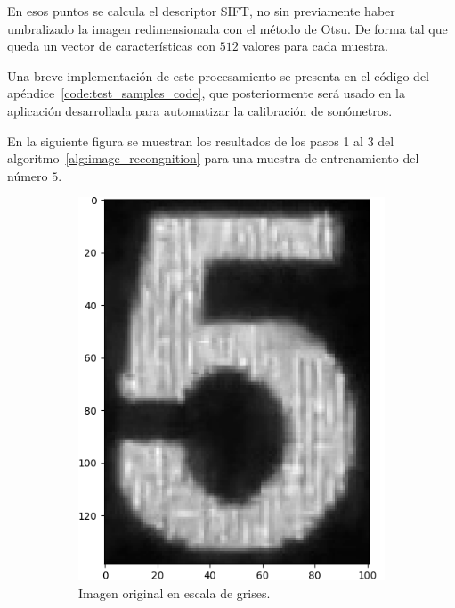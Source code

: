 En esos puntos se calcula el descriptor SIFT, no sin previamente haber umbralizado la imagen redimensionada con el método de Otsu.
De forma tal que queda un vector de características con $512$ valores para cada muestra.

Una breve implementación de este procesamiento se presenta en el código del apéndice~\ref{code:test_samples_code}, que posteriormente será usado en la aplicación desarrollada para automatizar la calibración de sonómetros.

En la siguiente figura se muestran los resultados de los pasos 1 al 3 del algoritmo~\ref{alg:image_recongnition} para una muestra de entrenamiento del número $5$.
%
\begin{figure}[hb!]
    \caption{Resultados de procesamiento de una muestra de entrenamiento del número $5$.}
    \label{fig:train_sample5_processing}
    \centering
    \begin{subfigure}[t]{0.48\textwidth}
        \centering
        \includegraphics[height=\x1cm]{3_Reconocimiento/Figs/train_sample5_original}
        \caption{Imagen original en escala de grises.}
    \end{subfigure}
    \hfill
    \begin{subfigure}[t]{0.48\textwidth}
        \centering

\end{subfigure}
\end{figure}
